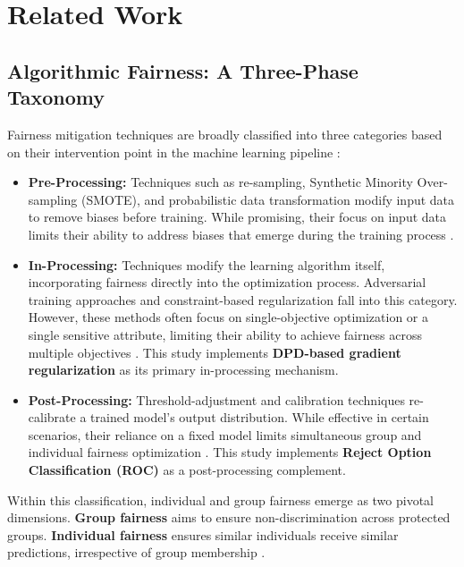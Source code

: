 \documentclass[12pt,a4paper]{article}
\begin{document}
\section{Related Work}

\subsection{Algorithmic Fairness: A Three-Phase Taxonomy}

Fairness mitigation techniques are broadly classified into three categories based on their intervention point in the machine learning pipeline \cite{caton2020fairness}:

\begin{itemize}
    \item \textbf{Pre-Processing:} Techniques such as re-sampling, Synthetic Minority Over-sampling (SMOTE), and probabilistic data transformation modify input data to remove biases before training. While promising, their focus on input data limits their ability to address biases that emerge during the training process \cite{feldman2015certifying}.
    \item \textbf{In-Processing:} Techniques modify the learning algorithm itself, incorporating fairness directly into the optimization process. Adversarial training approaches and constraint-based regularization fall into this category. However, these methods often focus on single-objective optimization or a single sensitive attribute, limiting their ability to achieve fairness across multiple objectives \cite{zhang2018mitigating}. This study implements \textbf{DPD-based gradient regularization} as its primary in-processing mechanism.
    \item \textbf{Post-Processing:} Threshold-adjustment and calibration techniques re-calibrate a trained model's output distribution. While effective in certain scenarios, their reliance on a fixed model limits simultaneous group and individual fairness optimization \cite{hardt2016equality}. This study implements \textbf{Reject Option Classification (ROC)} as a post-processing complement.
\end{itemize}

Within this classification, individual and group fairness emerge as two pivotal dimensions. \textbf{Group fairness} aims to ensure non-discrimination across protected groups. \textbf{Individual fairness} ensures similar individuals receive similar predictions, irrespective of group membership \cite{dwork2012fairness}.
\end{document}
